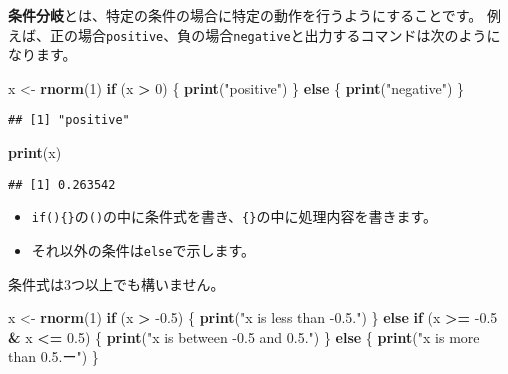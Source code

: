\documentclass[]{bxjsarticle}
\newenvironment{Shaded}{\begin{snugshade}}{\end{snugshade}}
\newcommand{\ControlFlowTok}[1]{\textcolor[rgb]{0.13,0.29,0.53}{\textbf{#1}}}
\newcommand{\DecValTok}[1]{\textcolor[rgb]{0.00,0.00,0.81}{#1}}
\newcommand{\FloatTok}[1]{\textcolor[rgb]{0.00,0.00,0.81}{#1}}
\newcommand{\KeywordTok}[1]{\textcolor[rgb]{0.13,0.29,0.53}{\textbf{#1}}}
\newcommand{\NormalTok}[1]{#1}
\newcommand{\OperatorTok}[1]{\textcolor[rgb]{0.81,0.36,0.00}{\textbf{#1}}}
\newcommand{\StringTok}[1]{\textcolor[rgb]{0.31,0.60,0.02}{#1}}
\providecommand{\tightlist}{%
  \setlength{\itemsep}{0pt}\setlength{\parskip}{0pt}}
\begin{document}
\textbf{条件分岐}とは、特定の条件の場合に特定の動作を行うようにすることです。
例えば、正の場合\texttt{positive}、負の場合\texttt{negative}と出力するコマンドは次のようになります。

\begin{Shaded}
\begin{Highlighting}[]
\NormalTok{x <-}\StringTok{ }\KeywordTok{rnorm}\NormalTok{(}\DecValTok{1}\NormalTok{)}
\ControlFlowTok{if}\NormalTok{ (x }\OperatorTok{>}\StringTok{ }\DecValTok{0}\NormalTok{) \{}
  \KeywordTok{print}\NormalTok{(}\StringTok{"positive"}\NormalTok{)}
\NormalTok{\} }\ControlFlowTok{else}\NormalTok{ \{}
  \KeywordTok{print}\NormalTok{(}\StringTok{"negative"}\NormalTok{)}
\NormalTok{\}}
\end{Highlighting}
\end{Shaded}

\begin{verbatim}
## [1] "positive"
\end{verbatim}

\begin{Shaded}
\begin{Highlighting}[]
\KeywordTok{print}\NormalTok{(x)}
\end{Highlighting}
\end{Shaded}

\begin{verbatim}
## [1] 0.263542
\end{verbatim}

\begin{itemize}
\tightlist
\item
  \texttt{if()\{\}}の\texttt{()}の中に条件式を書き、\texttt{\{\}}の中に処理内容を書きます。
\item
  それ以外の条件は\texttt{else}で示します。
\end{itemize}

条件式は3つ以上でも構いません。

\begin{Shaded}
\begin{Highlighting}[]
\NormalTok{x <-}\StringTok{ }\KeywordTok{rnorm}\NormalTok{(}\DecValTok{1}\NormalTok{)}
\ControlFlowTok{if}\NormalTok{ (x }\OperatorTok{>}\StringTok{ }\FloatTok{-0.5}\NormalTok{) \{}
  \KeywordTok{print}\NormalTok{(}\StringTok{"x is less than -0.5."}\NormalTok{)}
\NormalTok{\} }\ControlFlowTok{else} \ControlFlowTok{if}\NormalTok{ (x }\OperatorTok{>=}\StringTok{ }\FloatTok{-0.5} \OperatorTok{&}\StringTok{ }\NormalTok{x }\OperatorTok{<=}\StringTok{ }\FloatTok{0.5}\NormalTok{) \{}
  \KeywordTok{print}\NormalTok{(}\StringTok{"x is between -0.5 and 0.5."}\NormalTok{)}
\NormalTok{\} }\ControlFlowTok{else}\NormalTok{ \{}
  \KeywordTok{print}\NormalTok{(}\StringTok{"x is more than 0.5.ー"}\NormalTok{)}
\NormalTok{\}}
\end{Highlighting}
\end{Shaded}
\end{document}
